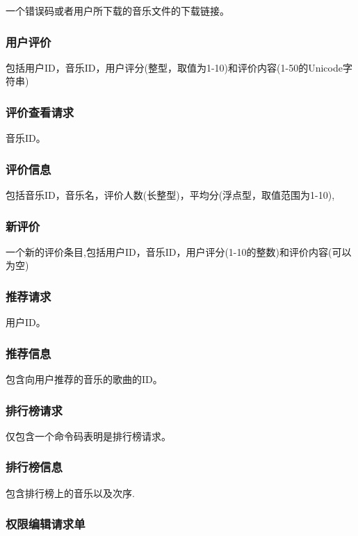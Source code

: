 一个错误码或者用户所下载的音乐文件的下载链接。

\subsubsection{用户评价}

包括用户ID，音乐ID，用户评分(整型，取值为1-10)和评价内容(1-50的Unicode字符串)

\subsubsection{评价查看请求}

音乐ID。

\subsubsection{评价信息}

包括音乐ID，音乐名，评价人数(长整型)，平均分(浮点型，取值范围为1-10),

\subsubsection{新评价}

一个新的评价条目,包括用户ID，音乐ID，用户评分(1-10的整数)和评价内容(可以为空)

\subsubsection{推荐请求}

用户ID。

\subsubsection{推荐信息}

包含向用户推荐的音乐的歌曲的ID。

\subsubsection{排行榜请求}

仅包含一个命令码表明是排行榜请求。

\subsubsection{排行榜信息}

包含排行榜上的音乐以及次序.

\subsubsection{权限编辑请求单}

